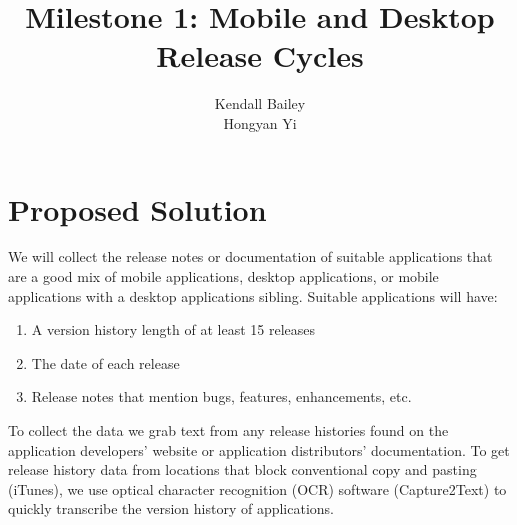 \documentclass{acm_proc_article-sp}
\begin{document}
\title{Milestone 1: Mobile and Desktop Release Cycles}

\author{
\alignauthor
Kendall Bailey \\
\alignauthor
Hongyan Yi \\
}

\maketitle




\section{Proposed Solution}
We will collect the release notes or documentation of suitable applications that are a good mix of mobile applications, desktop applications, or  mobile applications with a desktop applications sibling. 
Suitable applications will have:

\begin{enumerate}
	\item A version history length of at least 15 releases
	\item The date of each release
	\item Release notes that mention bugs, features, enhancements, etc.
\end{enumerate}

To collect the data we grab text from any release histories found on the application developers' website or application distributors' documentation. 
To get release history data from locations that block conventional copy and pasting (\eg iTunes), we use optical character recognition (OCR) software (Capture2Text) to quickly transcribe the version history of applications.
\end{document}
